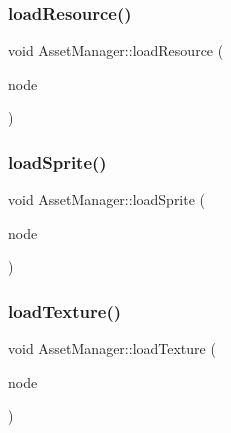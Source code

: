 \mbox{\label{class_asset_manager_acd58c4bf639bce1267a85451d6524c4f}} 
\subsubsection{\texorpdfstring{load\+Resource()}{loadResource()}}
{\footnotesize\ttfamily void Asset\+Manager\+::load\+Resource (\begin{DoxyParamCaption}\item[{\hyperlink{class_asset_manager_1_1_node}{Node} $\ast$}]{node }\end{DoxyParamCaption})\hspace{0.3cm}{\ttfamily [private]}}

\mbox{\label{class_asset_manager_adbb50534471c66993a4a8df81414bdbd}} 
\subsubsection{\texorpdfstring{load\+Sprite()}{loadSprite()}}
{\footnotesize\ttfamily void Asset\+Manager\+::load\+Sprite (\begin{DoxyParamCaption}\item[{\hyperlink{class_asset_manager_1_1_node}{Asset\+Manager\+::\+Node} $\ast$}]{node }\end{DoxyParamCaption})\hspace{0.3cm}{\ttfamily [private]}}

\mbox{\label{class_asset_manager_acc8ffdac1c10300a4964e8c8d5764ddd}} 
\subsubsection{\texorpdfstring{load\+Texture()}{loadTexture()}}
{\footnotesize\ttfamily void Asset\+Manager\+::load\+Texture (\begin{DoxyParamCaption}\item[{\hyperlink{class_asset_manager_1_1_node}{Node} $\ast$}]{node }\end{DoxyParamCaption})\hspace{0.3cm}{\ttfamily [private]}}

